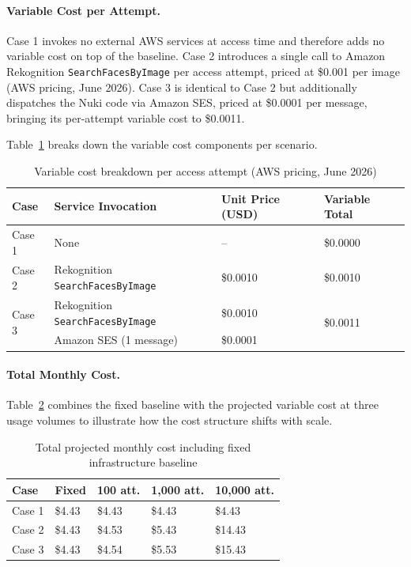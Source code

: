 \paragraph{Variable Cost per Attempt.}
Case 1 invokes no external AWS services at access time and therefore adds no variable cost on top of the baseline. Case 2 introduces a single call to Amazon Rekognition \texttt{SearchFacesByImage} per access attempt, priced at \$0.001 per image (AWS pricing, June 2026). Case 3 is identical to Case 2 but additionally dispatches the Nuki code via Amazon SES, priced at \$0.0001 per message, bringing its per-attempt variable cost to \$0.0011.

Table~\ref{tab:cost_breakdown} breaks down the variable cost components per scenario.

\begin{table}[H]
\centering
\caption{Variable cost breakdown per access attempt (AWS pricing, June 2026)}
\label{tab:cost_breakdown}
\begin{tabular}{p{1.5cm}p{3.5cm}p{2.8cm}p{2.8cm}}
\hline
\textbf{Case} & \textbf{Service Invocation} & \textbf{Unit Price (USD)} & \textbf{Variable Total} \\
\hline
Case 1 & None & -- & \$0.0000 \\
\hline
Case 2 & Rekognition \texttt{SearchFacesByImage} & \$0.0010 & \$0.0010 \\
\hline
\multirow{2}{*}{Case 3} & Rekognition \texttt{SearchFacesByImage} & \$0.0010 & \multirow{2}{*}{\$0.0011} \\
                         & Amazon SES (1 message)                  & \$0.0001 & \\
\hline
\end{tabular}
\end{table}

\paragraph{Total Monthly Cost.}
Table~\ref{tab:monthly_cost} combines the fixed baseline with the projected variable cost at three usage volumes to illustrate how the cost structure shifts with scale.

\begin{table}[H]
\centering
\caption{Total projected monthly cost including fixed infrastructure baseline}
\label{tab:monthly_cost}
\begin{tabular}{p{1.5cm}p{2.0cm}p{2.2cm}p{2.2cm}p{2.2cm}}
\hline
\textbf{Case} & \textbf{Fixed} & \textbf{100 att.} & \textbf{1{,}000 att.} & \textbf{10{,}000 att.} \\
\hline
Case 1 & \$4.43 & \$4.43 & \$4.43  & \$4.43  \\
Case 2 & \$4.43 & \$4.53 & \$5.43  & \$14.43 \\
Case 3 & \$4.43 & \$4.54 & \$5.53  & \$15.43 \\
\hline
\end{tabular}
\end{table}

